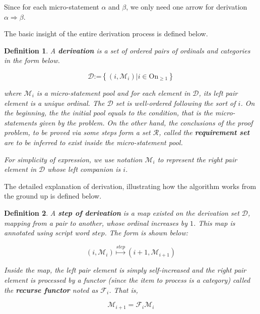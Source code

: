\documentclass{aims}
\numberwithin{equation}{section}
\newtheorem{definition}{Definition}	%
\numberwithin{theorem}{section}	%
\numberwithin{axiom}{section}	%
\numberwithin{definition}{section}	%
\begin{document}
	Since for each micro-statement \(\alpha\) and \(\beta\), we only need one arrow for derivation \(\alpha \Rightarrow \beta\).
	
	The basic insight of the entire derivation process is defined below.
	
	\begin{definition}
		A \textbf{ derivation} is a set of ordered pairs of ordinals and categories in the form below. 
		
		\begin{equation}
			\mathcal{D}\text{:=}\left\{\left(i,\mathcal{M}_i\right)|i\in \text{On}_{\geq 1}\right\}
		\end{equation}
		
		\noindent where \(\mathcal{M}_i\) { }is a micro-statement pool and for each element in \(\mathcal{D}\), its left pair element is a unique ordinal. The $\mathcal{D}$ set is well-ordered following the sort of \(i\). On the beginning, the the initial pool equals to the condition, that is the micro-statements given by the problem. On the other hand, the conclusions of the proof problem, to be proved via some steps form a set \(\mathcal{R}\), called the \textbf{requirement set} are to be inferred to exist inside the micro-statement pool.
		
		For simplicity of expression, we use notation \(\mathcal{M}_i\) to represent the right pair element in $\mathcal{D}$ { }whose left companion is \(i\).
	\end{definition}
	
	The detailed explanation of derivation, illustrating how the algorithm works from the ground up is defined below.
	
	\begin{definition}
		A \textbf{ step of derivation} is a map existed on the derivation set \(\mathcal{D}\), mapping from a pair to another, whose ordinal increases by \(1\). This map is annotated using script word \(\mathit{s}\mathit{t}\mathit{e}\mathit{p}\). The form is shown below:
		
		\begin{equation}
			\left(i,\mathcal{M}_i\right)\overset{\mathit{s}\mathit{t}\mathit{e}\mathit{p}}{\mapsto }\left(i+1,\mathcal{M}_{i+1}\right)
		\end{equation}
		
		Inside the map, the left pair element is simply self-increased and the right pair element is processed by a functor (since the item to process is a category) called the \textbf{ recurse functor} noted as \(\mathcal{F}_i\). That is,
		
		\begin{equation}
			\mathcal{M}_{i+1}=\mathcal{F}_i\mathcal{M}_i
		\end{equation}
	\end{definition}
	
\end{document}
